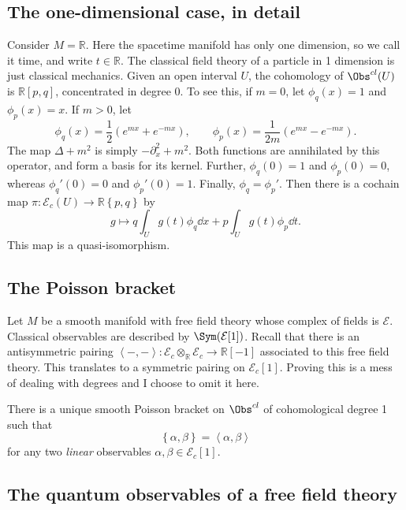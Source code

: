\subsection{The one-dimensional case, in detail}

Consider $M=\mathbb{R} $. Here the spacetime manifold has only one dimension, so we call it time, and write $t\in\mathbb{R} $. The classical field theory of a particle in 1 dimension is just classical mechanics. Given an open interval $U$, the cohomology of $\Obs^{cl}(U) $ is $\mathbb{R} [p,q]$, concentrated in degree 0. To see this, if $m=0$, let $\phi _q(x)=1$ and $\phi_p(x)=x$. If $m>0$, let
\[
	\phi _q(x) = \frac{1}{2} \left( e^{mx} +e^{-mx}  \right) ,\qquad \phi _p(x) = \frac{1}{2m} \left( e^{mx} -e^{-mx}  \right) 
.\]
The map $\Delta+m^2$ is simply $-\partial_x^2+m^2$. Both functions are annihilated by this operator, and form a basis for its kernel. Further, $\phi _q(0)=1$ and $\phi _p(0)=0$, whereas $\phi _q'(0)=0$ and $\phi _p'(0)=1$. Finally, $\phi _q=\phi_p'$. Then there is a cochain map $\pi : \mathcal{E}_c(U) \to \mathbb{R} \left\{ p,q \right\} $ by
\[
	g\mapsto q \int_{U} g(t)\phi _q\dd x + p \int_{U} g(t)\phi _p\dd t
.\]
This map is a quasi-isomorphism.

\subsection{The Poisson bracket}

Let $M$ be a smooth manifold with free field theory whose complex of fields is $\mathcal{E} $. Classical observables are described by $\Sym (\mathcal{E} [1])$. Recall that there is an antisymmetric pairing $\left\langle -,- \right\rangle : \mathcal{E} _c\otimes_\mathbb{R} \mathcal{E} _c\to \mathbb{R} [-1]$ associated to this free field theory. This translates to a symmetric pairing on $\mathcal{E} _c[1]$. Proving this is a mess of dealing with degrees and I choose to omit it here.

\begin{lemma}\label{lma:4-2-5-1}
	There is a unique smooth Poisson bracket on $\Obs^{cl} $ of cohomological degree 1 such that
	\[
		\left\{ \alpha ,\beta  \right\} =\left\langle \alpha ,\beta  \right\rangle 
	\]
	for any two \emph{linear} observables $\alpha ,\beta \in \mathcal{E} _c[1]$.
\end{lemma}

\subsection{The quantum observables of a free field theory}

